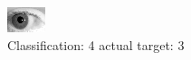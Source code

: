 \begin{figure}[h!]
\begin{center}
\includegraphics[width=0.60\columnwidth]{figures/ID216_class_4_target_3.png}
\end{center}
\caption{ Classification: 4 actual target: 3}
\label{fig:ID216_class_4_target_3}
\end{figure}
